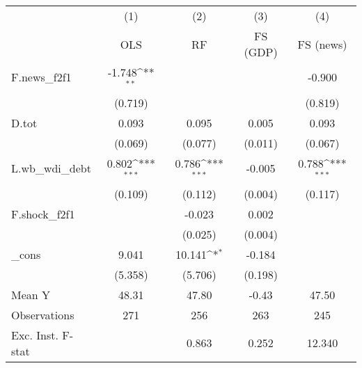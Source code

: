 {
\def\sym#1{\ifmmode^{#1}\else\(^{#1}\)\fi}
\begin{tabular}{l*{4}{c}}
\toprule
            &\multicolumn{1}{c}{(1)}&\multicolumn{1}{c}{(2)}&\multicolumn{1}{c}{(3)}&\multicolumn{1}{c}{(4)}\\
            &\multicolumn{1}{c}{OLS}&\multicolumn{1}{c}{RF}&\multicolumn{1}{c}{FS (GDP)}&\multicolumn{1}{c}{FS (news)}\\
\midrule
F.news\_f2f1 &      -1.748\sym{**} &                     &                     &      -0.900         \\
            &     (0.719)         &                     &                     &     (0.819)         \\
\addlinespace
D.tot       &       0.093         &       0.095         &       0.005         &       0.093         \\
            &     (0.069)         &     (0.077)         &     (0.011)         &     (0.067)         \\
\addlinespace
L.wb\_wdi\_debt&       0.802\sym{***}&       0.786\sym{***}&      -0.005         &       0.788\sym{***}\\
            &     (0.109)         &     (0.112)         &     (0.004)         &     (0.117)         \\
\addlinespace
F.shock\_f2f1&                     &      -0.023         &       0.002         &                     \\
            &                     &     (0.025)         &     (0.004)         &                     \\
\addlinespace
\_cons      &       9.041         &      10.141\sym{*}  &      -0.184         &                     \\
            &     (5.358)         &     (5.706)         &     (0.198)         &                     \\
\midrule
Mean Y      &       48.31         &       47.80         &       -0.43         &       47.50         \\
Observations&         271         &         256         &         263         &         245         \\
Exc. Inst. F-stat&                     &       0.863         &       0.252         &      12.340         \\
\bottomrule
\end{tabular}
}
